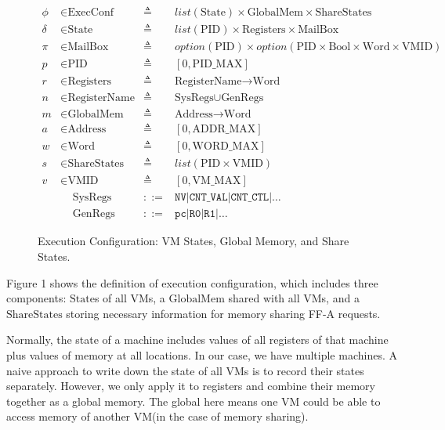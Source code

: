 \documentclass[a4paper]{article}
\newcommand*{\defined}{\triangleq}
\newcommand*{\maps}{\rightarrow}
\newcommand*{\derived}{::=}
\newcommand*{\CONF}{\text{ExecConf}}
\newcommand*{\STATE}{\text{State}}
\newcommand*{\MEM}{\text{GlobalMem}}
\newcommand*{\SSS}{\text{ShareStates}}
\newcommand*{\PID}{\text{PID}}
\newcommand*{\REGS}{\text{Registers}}
\newcommand*{\ADDR}{\text{Address}}
\newcommand*{\WORD}{\text{Word}}
\newcommand*{\VMID}{\text{VMID}}
\newcommand*{\REGNAMES}{\text{RegisterName}}
\newcommand*{\MB}{\text{MailBox}}
\newcommand*{\TIMER}{\text{Timer}}
\newcommand*{\PAMAX}{\text{ADDR\_MAX}}
\newcommand*{\PPIDMAX}{\text{PID\_MAX}}
\newcommand*{\PWMAX}{\text{WORD\_MAX}}
\newcommand*{\PVMMAX}{\text{VM\_MAX}}
\begin{document}
\begin{figure}
  \begin{align*}
    \phi &\in \CONF &\defined &list(\STATE) \times \MEM \times \SSS \\
    \delta &\in \STATE &\defined &list(\PID) \times \REGS \times \MB \\%
    \pi & \in \MB &\defined &option(\PID) \times option(\PID \times \text{Bool} \times \WORD \times \VMID) \\
    p & \in \PID &\defined  &[ 0, \PPIDMAX ] \\
    r & \in \REGS &\defined  &\REGNAMES \maps \WORD \\
    n & \in \REGNAMES &\defined &\text{SysRegs} \cup \text{GenRegs} \\
    m & \in \MEM &\defined  &\ADDR \maps \WORD \\
    a & \in \ADDR &\defined  &[ 0, \PAMAX ] \\
    w & \in \WORD &\defined  &[ 0, \PWMAX ] \\
    s & \in \SSS &\defined  &list(\PID \times \VMID) \\
    v & \in \VMID &\defined  &[ 0, \PVMMAX ] \\
      & \;\;\;\; \text{SysRegs} &\derived & \mathtt{NV} | \mathtt{CNT\_VAL} | \mathtt{CNT\_CTL} | \dots \\
      & \;\;\;\; \text{GenRegs} &\derived & \mathtt{pc} | \mathtt {R0} | \mathtt{R1} | \dots
  \end{align*}
  \caption{Execution Configuration: VM States, Global Memory, and Share States.}
\end{figure}
Figure 1 shows the definition of execution configuration, which includes three
components: $\STATE$s of all VMs, a $\MEM$ shared with all VMs, and a $\SSS$
storing necessary information for memory sharing FF-A requests.

Normally, the state of a machine includes values of all
registers of that machine plus values of memory at all locations. In our case,
we have multiple machines. A naive approach to write down the state of all VMs
is to record their states separately. However, we only apply it to registers and
combine their memory together as a global memory. The global here means one VM
could be able to access memory of another VM(in the case of memory sharing).
\end{document}
